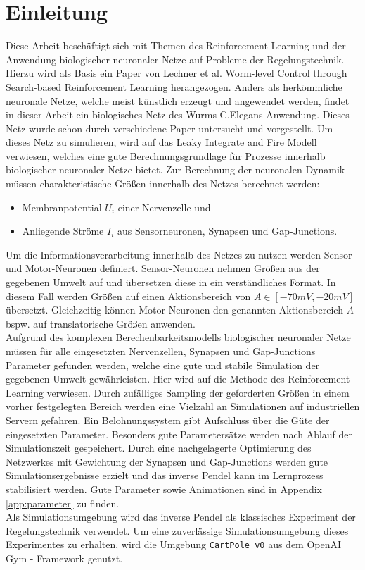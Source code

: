 %
\chapter{Einleitung}
\label{chap:einleitung}
%

	Diese Arbeit beschäftigt sich mit Themen des Reinforcement Learning und der Anwendung biologischer neuronaler Netze auf Probleme der Regelungstechnik.\\
	Hierzu wird als Basis ein Paper von Lechner et al. \glqq Worm-level Control through Search-based Reinforcement Learning \grqq{} \cite{WormLevelRL} herangezogen. Anders als herkömmliche neuronale Netze, welche meist künstlich erzeugt und angewendet werden, findet in dieser Arbeit ein biologisches Netz des Wurms C.Elegans Anwendung. Dieses Netz wurde schon durch verschiedene Paper \cite{CElegans} \cite{SimCE} \cite{Wicks1996} untersucht und vorgestellt. Um dieses Netz zu simulieren, wird auf das Leaky Integrate and Fire Modell verwiesen, welches eine gute Berechnungsgrundlage für Prozesse innerhalb biologischer neuronaler Netze bietet. Zur Berechnung der neuronalen Dynamik müssen charakteristische Größen innerhalb des Netzes berechnet werden:
	\begin{itemize}
		\item Membranpotential $U_i$ einer Nervenzelle und
		\item Anliegende Ströme $I_i$ aus Sensorneuronen, Synapsen und Gap-Junctions.
	\end{itemize}
	Um die Informationsverarbeitung innerhalb des Netzes zu nutzen werden Sensor- und Motor-Neuronen definiert. Sensor-Neuronen nehmen Größen aus der gegebenen Umwelt auf und übersetzen diese in ein verständliches Format. In diesem Fall werden Größen auf einen Aktionsbereich von $A \in [-70mV, -20mV]$ übersetzt. Gleichzeitig können Motor-Neuronen den genannten Aktionsbereich $A$ bspw. auf translatorische Größen anwenden.\\
	Aufgrund des komplexen Berechenbarkeitsmodells biologischer neuronaler Netze müssen für alle eingesetzten Nervenzellen, Synapsen und Gap-Junctions Parameter gefunden werden, welche eine gute und stabile Simulation der gegebenen Umwelt gewährleisten. Hier wird auf die Methode des Reinforcement Learning verwiesen. Durch zufälliges Sampling der geforderten Größen in einem vorher festgelegten Bereich werden eine Vielzahl an Simulationen auf industriellen Servern gefahren. Ein Belohnungssystem gibt Aufschluss über die Güte der eingesetzten Parameter. Besonders gute Parametersätze werden nach Ablauf der Simulationszeit gespeichert. Durch eine nachgelagerte Optimierung des Netzwerkes mit Gewichtung der Synapsen und Gap-Junctions werden gute Simulationsergebnisse erzielt und das inverse Pendel kann im Lernprozess stabilisiert werden. Gute Parameter sowie Animationen sind in Appendix \ref{app:parameter} zu finden.\\
	Als Simulationsumgebung wird das inverse Pendel als klassisches Experiment der Regelungstechnik verwendet. Um eine zuverlässige Simulationsumgebung dieses Experimentes zu erhalten, wird die Umgebung \texttt{CartPole\_v0} aus dem OpenAI Gym - Framework genutzt.\\


